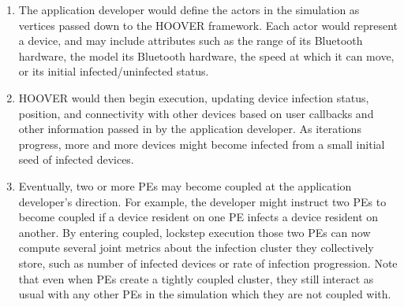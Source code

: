 \begin{enumerate}
    \item The application developer would define the actors in the simulation as
        vertices passed down to the HOOVER framework. Each actor would represent
        a device, and may include attributes such as the range of its Bluetooth
        hardware, the model its Bluetooth hardware, the speed at which it can
        move, or its initial infected/uninfected status.
    \item HOOVER would then begin execution, updating device infection status,
        position, and connectivity with other devices based on user callbacks and
        other information passed in by the application developer. As iterations
        progress, more and more devices might become infected from a small
        initial seed of infected devices.
    \item Eventually, two or more PEs may become coupled at the application
        developer's direction. For example, the developer might instruct two PEs
        to become coupled if a device resident on one PE infects a device resident
        on another. By entering coupled, lockstep execution those two PEs can
        now compute several joint metrics about the infection cluster they
        collectively store, such as number of infected devices or rate of
        infection progression. Note that even when PEs create a tightly coupled
        cluster, they still interact as usual with any other PEs in the
        simulation which they are not coupled with.
\end{enumerate}
